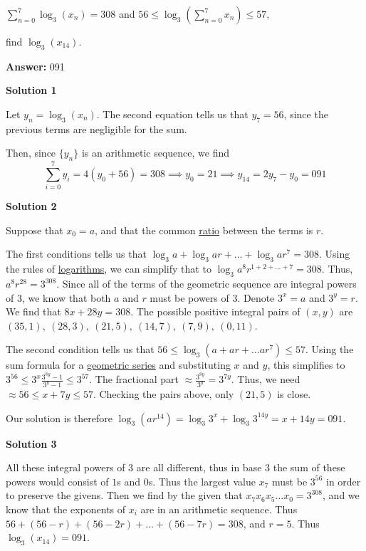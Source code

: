 \begin{enumerate}
 $\sum_{n=0}^{7}\log_{3}(x_{n}) = 308$ and $56 \leq \log_{3}\left ( \sum_{n=0}^{7}x_{n}\right ) \leq 57,$


 find $\log_{3}(x_{14}).$

 \textbf{Answer: }091



\textbf{Solution 1}

Let $y_n = \log_3 (x_n)$. The second equation tells us that $y_7 = 56$, since the previous terms are negligible for the sum. 

 Then, since $\{y_n\}$ is an arithmetic sequence, we find 
 \[\sum_{i=0}^{7}y_i=4(y_0+56)=308 \implies y_0=21 \implies y_{14}=2y_7-y_0=\boxed{091}\]




\textbf{Solution 2}

Suppose that $x_0 = a$, and that the common \href{https://artofproblemsolving.com/wiki/index.php?title=Ratio}{ratio} between the terms is $r$. 

 
The first conditions tells us that $\log_3 a + \log_3 ar + \ldots + \log_3 ar^7 = 308$. Using the rules of \href{https://artofproblemsolving.com/wiki/index.php?title=Logarithm}{logarithms}, we can simplify that to $\log_3 a^8r^{1 + 2 + \ldots + 7} = 308$. Thus, $a^8r^{28} = 3^{308}$. Since all of the terms of the geometric sequence are integral powers of $3$, we know that both $a$ and $r$ must be powers of 3. Denote $3^x = a$ and $3^y = r$. We find that $8x + 28y = 308$. The possible positive integral pairs of $(x,y)$ are $(35,1),\ (28,3),\ (21,5),\ (14,7),\ (7,9),\ (0,11)$.

 
The second condition tells us that $56 \le \log_3 (a + ar + \ldots ar^7) \le 57$. Using the sum formula for a \href{https://artofproblemsolving.com/wiki/index.php?title=Geometric\_series}{geometric series} and substituting $x$ and $y$, this simplifies to $3^{56} \le 3^x \frac{3^{8y} - 1}{3^y-1} \le 3^{57}$. The fractional part $\approx \frac{3^{8y}}{3^y} = 3^{7y}$. Thus, we need $\approx 56 \le x + 7y \le 57$. Checking the pairs above, only $(21,5)$ is close.

 
Our solution is therefore $\log_3 (ar^{14}) = \log_3 3^x + \log_3 3^{14y} = x + 14y = \boxed{091}$.

 



\textbf{Solution 3}

All these integral powers of $3$ are all different, thus in base $3$ the sum of these powers would consist of $1$s and $0$s. Thus the largest value $x_7$ must be $3^{56}$ in order to preserve the givens. Then we find by the given that $x_7x_6x_5\dots x_0 = 3^{308}$, and we know that the exponents of $x_i$ are in an arithmetic sequence. Thus $56+(56-r)+(56-2r)+\dots +(56-7r) = 308$, and $r = 5$. Thus $\log_3 (x_{14}) = \boxed{091}$.


\end{enumerate}
